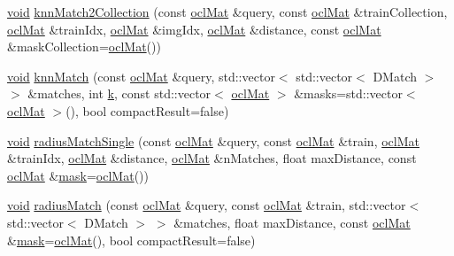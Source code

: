 \begin{DoxyCompactItemize}
\item 
\hyperlink{legacy_8hpp_a8bb47f092d473522721002c86c13b94e}{void} \hyperlink{classcv_1_1ocl_1_1BruteForceMatcher__OCL__base_abc0dbe82b0937d9aefe0009e72c1221f}{knn\-Match2\-Collection} (const \hyperlink{classcv_1_1ocl_1_1oclMat}{ocl\-Mat} \&query, const \hyperlink{classcv_1_1ocl_1_1oclMat}{ocl\-Mat} \&train\-Collection, \hyperlink{classcv_1_1ocl_1_1oclMat}{ocl\-Mat} \&train\-Idx, \hyperlink{classcv_1_1ocl_1_1oclMat}{ocl\-Mat} \&img\-Idx, \hyperlink{classcv_1_1ocl_1_1oclMat}{ocl\-Mat} \&distance, const \hyperlink{classcv_1_1ocl_1_1oclMat}{ocl\-Mat} \&mask\-Collection=\hyperlink{classcv_1_1ocl_1_1oclMat}{ocl\-Mat}())
\item 
\hyperlink{legacy_8hpp_a8bb47f092d473522721002c86c13b94e}{void} \hyperlink{classcv_1_1ocl_1_1BruteForceMatcher__OCL__base_ad9c01b9e6fa097194b882a359d359c29}{knn\-Match} (const \hyperlink{classcv_1_1ocl_1_1oclMat}{ocl\-Mat} \&query, std\-::vector$<$ std\-::vector$<$ D\-Match $>$ $>$ \&matches, int \hyperlink{legacy_8hpp_a7be9b6436e5ea72ff5d5a66779b4bd38}{k}, const std\-::vector$<$ \hyperlink{classcv_1_1ocl_1_1oclMat}{ocl\-Mat} $>$ \&masks=std\-::vector$<$ \hyperlink{classcv_1_1ocl_1_1oclMat}{ocl\-Mat} $>$(), bool compact\-Result=false)
\item 
\hyperlink{legacy_8hpp_a8bb47f092d473522721002c86c13b94e}{void} \hyperlink{classcv_1_1ocl_1_1BruteForceMatcher__OCL__base_ab10fba086aeae3a04d6fa4dd5663ff7f}{radius\-Match\-Single} (const \hyperlink{classcv_1_1ocl_1_1oclMat}{ocl\-Mat} \&query, const \hyperlink{classcv_1_1ocl_1_1oclMat}{ocl\-Mat} \&train, \hyperlink{classcv_1_1ocl_1_1oclMat}{ocl\-Mat} \&train\-Idx, \hyperlink{classcv_1_1ocl_1_1oclMat}{ocl\-Mat} \&distance, \hyperlink{classcv_1_1ocl_1_1oclMat}{ocl\-Mat} \&n\-Matches, float max\-Distance, const \hyperlink{classcv_1_1ocl_1_1oclMat}{ocl\-Mat} \&\hyperlink{tracking_8hpp_a6b13ecd2fd6ec7ad422f1d7863c3ad19}{mask}=\hyperlink{classcv_1_1ocl_1_1oclMat}{ocl\-Mat}())
\item 
\hyperlink{legacy_8hpp_a8bb47f092d473522721002c86c13b94e}{void} \hyperlink{classcv_1_1ocl_1_1BruteForceMatcher__OCL__base_a33241541cdc10d736ff4e9b80b6d59e8}{radius\-Match} (const \hyperlink{classcv_1_1ocl_1_1oclMat}{ocl\-Mat} \&query, const \hyperlink{classcv_1_1ocl_1_1oclMat}{ocl\-Mat} \&train, std\-::vector$<$ std\-::vector$<$ D\-Match $>$ $>$ \&matches, float max\-Distance, const \hyperlink{classcv_1_1ocl_1_1oclMat}{ocl\-Mat} \&\hyperlink{tracking_8hpp_a6b13ecd2fd6ec7ad422f1d7863c3ad19}{mask}=\hyperlink{classcv_1_1ocl_1_1oclMat}{ocl\-Mat}(), bool compact\-Result=false)

\end{DoxyCompactItemize}
